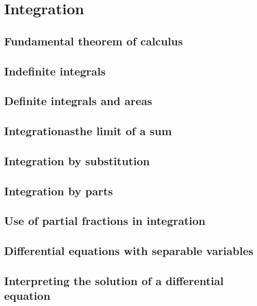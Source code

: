 \chapter{Integration}

\section{Fundamental theorem of calculus}
\section{Indefinite integrals}
\section{Definite integrals and areas}
\section{Integrationasthe limit of a sum}
\section{Integration by substitution}
\section{Integration by parts}
\section{Use of partial fractions in integration}
\section{Differential equations with separable variables}
\section{Interpreting the solution of a differential equation}
